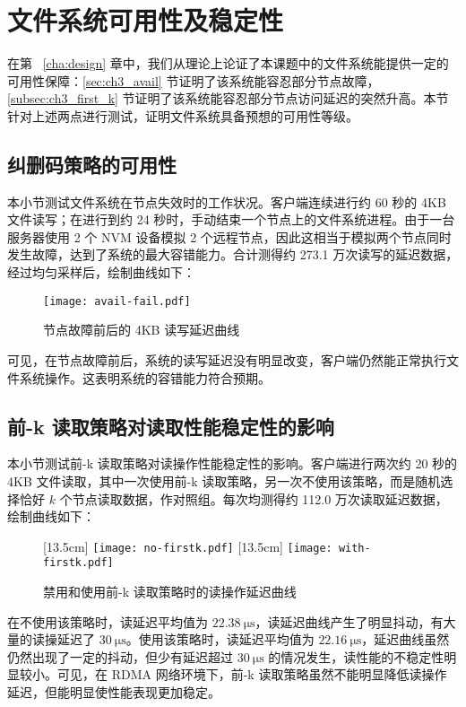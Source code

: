 \section{文件系统可用性及稳定性}
\label{sec:ch4_avail_test}

在第 ~\ref{cha:design} 章中，我们从理论上论证了本课题中的文件系统能提供一定的可用性保障：\ref{sec:ch3_avail} 节证明了该系统能容忍部分节点故障，\ref{subsec:ch3_first_k} 节证明了该系统能容忍部分节点访问延迟的突然升高。本节针对上述两点进行测试，证明文件系统具备预想的可用性等级。

\subsection{纠删码策略的可用性}
\label{subsec:ch4_fail_test}

本小节测试文件系统在节点失效时的工作状况。客户端连续进行约 60 秒的 4KB 文件读写；在进行到约 24 秒时，手动结束一个节点上的文件系统进程。由于一台服务器使用 2 个 NVM 设备模拟 2 个远程节点，因此这相当于模拟两个节点同时发生故障，达到了系统的最大容错能力。合计测得约 273.1 万次读写的延迟数据，经过均匀采样后，绘制曲线如下：

\begin{figure}[H]
    \centering
    \texttt{[image: avail-fail.pdf]}
    \caption{节点故障前后的 4KB 读写延迟曲线}
    \label{fig:avail_fail}
\end{figure}

可见，在节点故障前后，系统的读写延迟没有明显改变，客户端仍然能正常执行文件系统操作。这表明系统的容错能力符合预期。

\subsection{前-k 读取策略对读取性能稳定性的影响}
\label{subsec:ch4_first_k_test}

本小节测试前-k 读取策略对读操作性能稳定性的影响。客户端进行两次约 20 秒的 4KB 文件读取，其中一次使用前-k 读取策略，另一次不使用该策略，而是随机选择恰好 $k$ 个节点读取数据，作对照组。每次均测得约 112.0 万次读取延迟数据，绘制曲线如下：

\begin{figure}[H]
    \centering
    [13.5cm] 
        {\texttt{[image: no-firstk.pdf]}}
    [13.5cm] 
        {\texttt{[image: with-firstk.pdf]}}   
    \caption{禁用和使用前-k 读取策略时的读操作延迟曲线}
    \label{fig:first_k}
\end{figure}

在不使用该策略时，读延迟平均值为 $\SI{22.38}{\us}$，读延迟曲线产生了明显抖动，有大量的读操延迟了 $\SI{30}{\us}$。使用该策略时，读延迟平均值为 $\SI{22.16}{\us}$，延迟曲线虽然仍然出现了一定的抖动，但少有延迟超过 $\SI{30}{\us}$ 的情况发生，读性能的不稳定性明显较小。可见，在 RDMA 网络环境下，前-k 读取策略虽然不能明显降低读操作延迟，但能明显使性能表现更加稳定。
